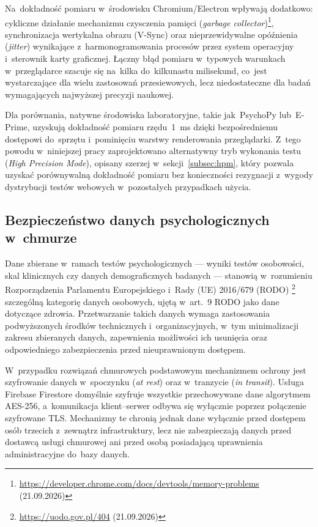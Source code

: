 \documentclass[12pt, a4paper, oneside]{report}
\begin{document}
Na~dokładność pomiaru w~środowisku Chromium/Electron wpływają
dodatkowo: cykliczne działanie mechanizmu czysczenia pamięci
(\textit{garbage collector})\footnote{\url{https://developer.chrome.com/docs/devtools/memory-problems} (21.09.2026)}, synchronizacja wertykalna obrazu (V-Sync)
oraz nieprzewidywalne opóźnienia (\textit{jitter}) wynikające
z~harmonogramowania procesów przez system operacyjny i~sterownik
karty graficznej. Łączny błąd pomiaru w~typowych warunkach
w~przeglądarce szacuje się na~kilka do~kilkunastu milisekund, co~jest
wystarczające dla wielu zastosowań przesiewowych, lecz niedostateczne
dla badań wymagających najwyższej precyzji naukowej.

Dla porównania, natywne środowiska laboratoryjne, takie jak~PsychoPy
lub~E-Prime, uzyskują dokładność pomiaru rzędu~1~ms dzięki
bezpośredniemu dostępowi do~sprzętu i~pominięciu warstwy renderowania
przeglądarki. Z~tego powodu w~niniejszej pracy zaprojektowano
alternatywny tryb wykonania testu (\textit{High Precision Mode}),
opisany szerzej w~sekcji~\ref{subsec:hpm}, który pozwala uzyskać
porównywalną dokładność pomiaru bez konieczności rezygnacji z~wygody
dystrybucji testów webowych w~pozostałych przypadkach użycia.

\subsection{Bezpieczeństwo danych psychologicznych w~chmurze}
\label{subsec:bezpieczenstwo}

Dane zbierane w~ramach testów psychologicznych --- wyniki testów
osobowości, skal klinicznych czy danych demograficznych badanych ---
stanowią w~rozumieniu Rozporządzenia Parlamentu Europejskiego i~Rady
(UE) 2016/679 (RODO) \footnote{\url{https://uodo.gov.pl/404} (21.09.2026)} szczególną kategorię danych osobowych, ujętą
w~art.~9 RODO jako dane dotyczące zdrowia. Przetwarzanie takich danych
wymaga zastosowania podwyższonych środków technicznych
i~organizacyjnych, w~tym minimalizacji zakresu zbieranych danych,
zapewnienia możliwości ich usunięcia oraz odpowiedniego zabezpieczenia
przed nieuprawnionym dostępem.

W~przypadku rozwiązań chmurowych podstawowym mechanizmem ochrony jest
szyfrowanie danych w~spoczynku (\textit{at rest}) oraz w~tranzycie
(\textit{in transit}). Usługa Firebase Firestore domyślnie szyfruje
wszystkie przechowywane dane algorytmem AES-256, a~komunikacja
klient--serwer odbywa się wyłącznie poprzez połączenie szyfrowane
TLS. Mechanizmy te chronią jednak dane wyłącznie przed dostępem osób
trzecich z~zewnątrz infrastruktury, lecz nie zabezpieczają danych przed
dostawcą usługi chmurowej ani przed osobą posiadającą uprawnienia
administracyjne do~bazy danych.
\end{document}
